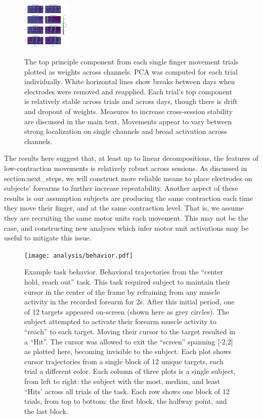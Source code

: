 \documentclass[../main.tex]{subfiles}
\begin{document}
\begin{figure}
\label{fig:PCA_components}
\centering
\includegraphics[width=0.2\textwidth]{images/data_analysis/fingers/PCA_components.pdf}
\caption{The top principle component from each single finger movement trials plotted as weights across channels. PCA was computed for each trial individually. White horizontal lines show breaks between days when electrodes were removed and reapplied. Each trial's top component is relatively stable across trials and across days, though there is drift and dropout of weights. Measures to increase cross-session stability are discussed in the main text. Movements appear to vary between strong localization on single channels and broad activation across channels.}\label{fig:PCA_components}
\end{figure}

The results here suggest that, at least up to linear decompositions, the features of low-contraction movements is relatively robust across sessions. As discussed in {section:next\_steps}, we will construct more reliable means to place electrodes on subjects' forearms to further increase repeatability. Another aspect of these results is our assumption subjects are producing the same contraction each time they move their finger, and at the same contraction level. That is, we assume they are recruiting the same motor units each movement. This may not be the case, and constructing new analyses which infer motor unit activations may be useful to mitigate this issue.






\begin{figure}
\centering
\texttt{[image: analysis/behavior.pdf]}
\caption{Example task behavior. Behavioral trajectories from the
``center hold, reach out'' task. This task required subject to maintain
their cursor in the center of the frame by refraining from any muscle
activity in the recorded forearm for 2s. After this initial period, one
of 12 targets appeared on-screen (shown here as grey circles). The
subject attempted to activate their forearm muscle activity to ``reach''    
to each target. Moving their cursor to the target resulted in a ``Hit''.
The cursor was allowed to exit the ``screen'' spanning {[}-2,2{]} as
plotted here, becoming invisible to the subject. Each plot shows cursor
trajectories from a single block of 12 unique targets, each trial a
different color. Each column of three plots is a single subject, from
left to right: the subject with the most, median, and least ``Hits'
across all trials of the task. Each row shows one block of 12 trials,
from top to bottom: the first block, the halfway point, and the last
block.}\label{fig:behavior}
\end{figure}
\end{document}
